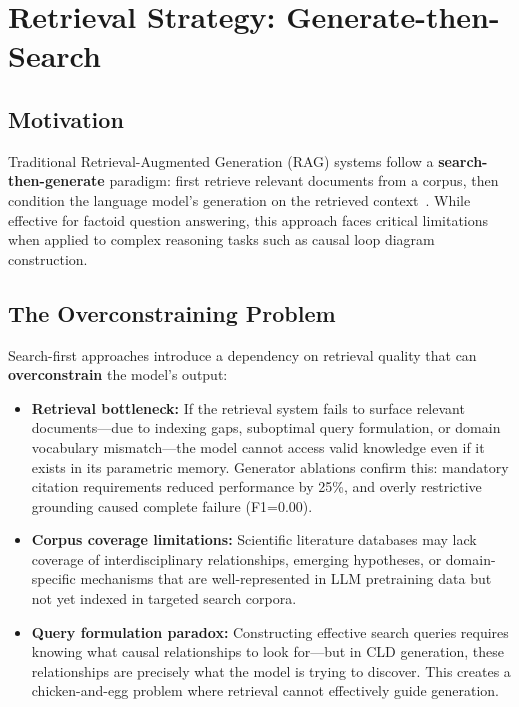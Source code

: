 \section{Retrieval Strategy: Generate-then-Search}
\label{sec:retrieval_strategy}

\subsection{Motivation}

Traditional Retrieval-Augmented Generation (RAG) systems follow a \textbf{search-then-generate} paradigm: first retrieve relevant documents from a corpus, then condition the language model's generation on the retrieved context~\cite{lewis2020rag}. While effective for factoid question answering, this approach faces critical limitations when applied to complex reasoning tasks such as causal loop diagram construction.

\subsection{The Overconstraining Problem}

Search-first approaches introduce a dependency on retrieval quality that can \textbf{overconstrain} the model's output:

\begin{itemize}[noitemsep]
    \item \textbf{Retrieval bottleneck:} If the retrieval system fails to surface relevant documents---due to indexing gaps, suboptimal query formulation, or domain vocabulary mismatch---the model cannot access valid knowledge even if it exists in its parametric memory. Generator ablations confirm this: mandatory citation requirements reduced performance by 25\%, and overly restrictive grounding caused complete failure (F1=0.00).
    \item \textbf{Corpus coverage limitations:} Scientific literature databases may lack coverage of interdisciplinary relationships, emerging hypotheses, or domain-specific mechanisms that are well-represented in LLM pretraining data but not yet indexed in targeted search corpora.
    \item \textbf{Query formulation paradox:} Constructing effective search queries requires knowing what causal relationships to look for---but in CLD generation, these relationships are precisely what the model is trying to discover. This creates a chicken-and-egg problem where retrieval cannot effectively guide generation.
\end{itemize}

